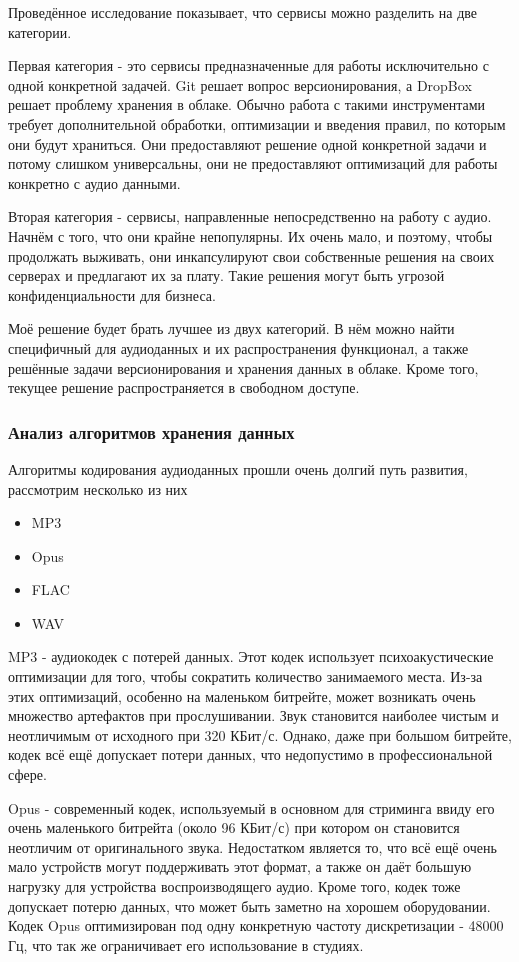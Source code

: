 \documentclass[14pt]{extarticle}
\begin{document}
Проведённое исследование показывает, что сервисы можно разделить на две категории. 

Первая категория - это сервисы предназначенные для работы исключительно с одной конкретной задачей. Git решает вопрос версионирования, а DropBox решает проблему 
хранения в облаке. Обычно работа с такими инструментами требует дополнительной обработки, оптимизации и введения правил, по которым они
будут храниться. Они предоставляют решение одной конкретной задачи и потому слишком универсальны, они не предоставляют
оптимизаций для работы конкретно с аудио данными.

Вторая категория - сервисы, направленные непосредственно на работу с аудио. Начнём с того, что они крайне непопулярны. Их очень мало, и 
поэтому, чтобы продолжать выживать, они инкапсулируют свои собственные решения на своих серверах и предлагают их за плату. 
Такие решения могут быть угрозой конфиденциальности для бизнеса.

Моё решение будет брать лучшее из двух категорий. В нём можно найти специфичный для аудиоданных и их распространения функционал, а также
решённые задачи версионирования и хранения данных в облаке. Кроме того, текущее решение распространяется в свободном доступе.

\subsubsection{Анализ алгоритмов хранения данных}

Алгоритмы кодирования аудиоданных прошли очень долгий путь развития, рассмотрим несколько из них

\begin{itemize}[label=$\bullet$]
	\item MP3
	\item Opus
	\item FLAC
	\item WAV
\end{itemize}

MP3 - аудиокодек с потерей данных. Этот кодек использует психоакустические оптимизации для того, чтобы сократить количество 
занимаемого места. Из-за этих оптимизаций, особенно на маленьком битрейте, может возникать очень множество артефактов при 
прослушивании. Звук становится наиболее чистым и неотличимым от исходного при 320 КБит/с. Однако, даже при большом битрейте, кодек всё ещё 
допускает потери данных, что недопустимо в профессиональной сфере.

Opus - современный кодек, используемый в основном для стриминга ввиду его очень маленького битрейта (около 96 КБит/с) при котором он становится 
неотличим от оригинального звука. Недостатком является то, что всё ещё очень мало устройств могут поддерживать этот формат, 
а также он даёт большую нагрузку для устройства воспроизводящего аудио. Кроме того, кодек тоже допускает потерю данных, что может быть
заметно на хорошем оборудовании. Кодек Opus оптимизирован под одну конкретную частоту дискретизации - 48000 Гц, что так же ограничивает
его использование в студиях.
\end{document}
